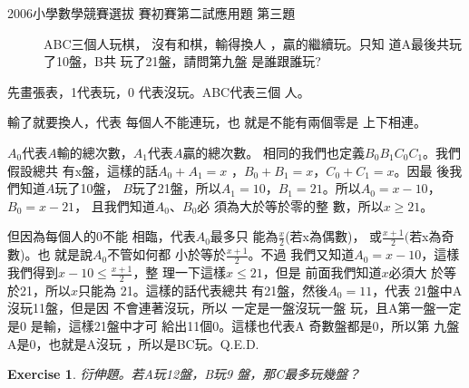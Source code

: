 \documentclass{article}
\newtheorem{exercise}[theorem]{Exercise}
\begin{document}
\begin{description}
\item[2006小學數學競賽選拔%
賽初賽第二試應用題%
第三題] ABC三個人玩棋，%
沒有和棋，輸得換人%
，贏的繼續玩。只知%
道A最後共玩了10盤，B共%
玩了21盤，請問第九盤%
是誰跟誰玩?
\end{description}

\bigskip

先畫張表，1代表玩，0%
代表沒玩。ABC代表三個%
人。

%
\begin{center}

\end{center}%
\bigskip 

輸了就要換人，代表%
每個人不能連玩，也%
就是不能有兩個零是%
上下相連。

\bigskip

$A_{0}$代表$A$輸的總次數，$%
A_{1}$代表$A$贏的總次數。%
相同的我們也定義$%
B_{0}B_{1}C_{0}C_{1}$。我們假設總共%
有x盤，這樣的話$A_{0}+A_{1}=x$%
，$B_{0}+B_{1}=x$，$C_{0}+C_{1}=x$。因最%
後我們知道$A$玩了10盤，%
$B$玩了21盤，所以$A_{1}=10$，$%
B_{1}=21$。所以$A_{0}=x-10$，$B_{0}=x-21$，%
且我們知道$A_{0}$、$B_{0}$必%
須為大於等於零的整%
數，所以$x\geq 21$。

\bigskip 

但因為每個人的0不能%
相臨，代表$A_{0}$最多只%
能為$\frac{x}{2}$(若x為偶數)，%
或$\frac{x+1}{2}($若x為奇數)。也%
就是說$A_{0}$不管如何都%
小於等於$\frac{x+1}{2}$。不過%
我們又知道$A_{0}=x-10$，這樣%
我們得到$x-10\leq \frac{x+1}{2}$，整%
理一下這樣$x\leq 21， $但是%
前面我們知道$x$必須大%
於等於21，所以$x$只能為%
21。這樣的話代表總共%
有21盤，然後$A_{0}=11$，代表%
21盤中A沒玩11盤，但是因%
不會連著沒玩，所以%
一定是一盤沒玩一盤%
玩，且A第一盤一定是0%
是輸，這樣21盤中才可%
給出11個0。這樣也代表A%
奇數盤都是0，所以第%
九盤A是0，也就是A沒玩%
，所以是BC玩。Q.E.D.

\bigskip

\begin{exercise}
衍伸題。若A玩12盤，B玩9%
盤，那C最多玩幾盤？
\end{exercise}

\end{document}

